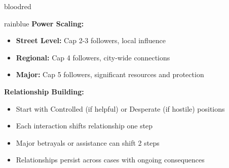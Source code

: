 \documentclass[11pt]{article}
\begin{document}
\begin{noirsection}{bloodred}
\begin{mechanicbox}{rainblue}
\textbf{Power Scaling:}
\begin{itemize}
    \item \textbf{Street Level:} Cap 2-3 followers, local influence
    \item \textbf{Regional:} Cap 4 followers, city-wide connections
    \item \textbf{Major:} Cap 5 followers, significant resources and protection
\end{itemize}

\textbf{Relationship Building:}
\begin{itemize}
    \item Start with Controlled (if helpful) or Desperate (if hostile) positions
    \item Each interaction shifts relationship one step
    \item Major betrayals or assistance can shift 2 steps
    \item Relationships persist across cases with ongoing consequences
\end{itemize}
\end{mechanicbox}
\end{noirsection}

\newpage
\end{document}
